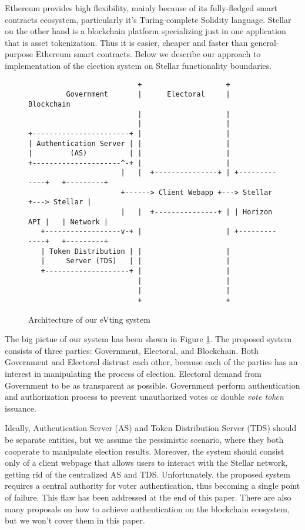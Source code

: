 \documentclass[runningheads]{llncs}
\begin{document}
Ethereum provides high flexibility, mainly because of its fully-fledged smart contracts ecosystem, particularly it’s Turing-complete Solidity language. 
Stellar on the other hand is a blockchain platform specializing just in one application that is asset tokenization. 
Thus it is easier, cheaper and faster than general-purpose Ethereum smart contracts. 
Below we describe our approach 
to implementation of 
the election system on Stellar functionality boundaries.


\begin{figure}
\begin{verbatim}
                          +                    +
         Government       |      Electoral     |      Blockchain
                          |                    |
                          |                    |
+-----------------------+ |                    |
| Authentication Server | |                    |
|         (AS)          | |                    |
+---------------------^-+ |                    |
                      |   |  +---------------+ | +-------------+   +---------+
                      +------> Client Webapp +---> Stellar     +---> Stellar |
                      |   |  +---------------+ | | Horizon API |   | Network |
   +------------------v-+ |                    | +-------------+   +---------+
   | Token Distribution | |                    |
   |     Server (TDS)   | |                    |
   +--------------------+ |                    |
                          |                    |
                          |                    |
                          +                    +
\end{verbatim}
\caption{Architecture of our eVting system}
\label{fig:ascii-box}
\end{figure} 

The big pictue of our system has been shown in Figure \ref{fig:ascii-box}.
The proposed system consists of three parties: Government, Electoral, and Blockchain. Both Government and Electoral distrust each other, because each of the parties has an interest in manipulating the process of election. Electoral demand from Government to be as transparent as possible. Government perform authentication and authorization process to prevent unauthorized votes or double \textit{vote token} issuance.

Ideally, Authentication Server (AS) and Token Distribution Server (TDS) should be separate entities, but we assume the pessimistic scenario, where they both cooperate to manipulate election results. Moreover, the system should consist only of a client webpage that allows users to interact with the Stellar network, getting rid of the centralized AS and TDS. Unfortunately, the proposed system requires a central authority for voter authentication, thus becoming a single point of failure. This flaw has been addressed at the end of this paper. There are also many proposals on how to achieve authentication on the blockchain ecosystem, but we won't cover them in this paper.
\end{document}
